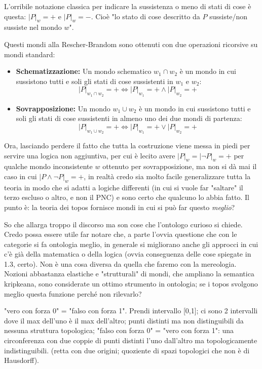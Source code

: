 \documentclass[a4paper, 11pt]{article}
\begin{document}
L'orribile notazione classica per indicare la sussistenza o meno di stati di cose è questa: $|P|_w = +$ e $|P|_w = -$. Cioè "lo stato di cose descritto da $P$ sussiste/non sussiste nel mondo $w$".

Questi mondi alla Rescher-Brandom sono ottenuti con due operazioni ricorsive su mondi standard:
\begin{itemize}
	\item \textbf{Schematizzazione:} Un mondo schematico $w_1 \cap w_2$ è un mondo in cui sussistono tutti e soli gli stati di cose sussistenti in $w_1$ e $w_2$:
	\[ |P|_{w_1 \cap w_2} = + \iff |P|_{w_1} = + \land |P|_{w_2} = + \]
	
	\item \textbf{Sovrapposizione:} Un mondo $w_1 \cup w_2$ è un mondo in cui sussistono tutti e soli gli stati di cose sussistenti in almeno uno dei due mondi di partenza:
	\[ |P|_{w_1 \cup w_2} = + \iff |P|_{w_1} = + \lor |P|_{w_2} = +\]
\end{itemize}     

Ora, lasciando perdere il fatto che tutta la costruzione viene messa in piedi per servire una logica non aggiuntiva, per cui è lecito avere $|P|_w = |\neg P|_w = +$ per qualche mondo inconsistente $w$ ottenuto per sovrapposizione, ma non si dà mai il caso in cui $|P \land \neg P|_w = +$, in realtà credo sia molto facile generalizzare tutta la teoria in modo che si adatti a logiche differenti (in cui si vuole far "saltare" il terzo escluso o altro, e non il PNC) e sono certo che qualcuno lo abbia fatto. Il punto è: la teoria dei topos fornisce mondi in cui si può far questo \emph{meglio}?

So che allarga troppo il discorso ma son cose che l'ontologo curioso si chiede. Credo possa essere utile far notare che, a parte l'ovvia questione che con le categorie si fa ontologia meglio, in generale si migliorano anche gli approcci in cui c'è già della matematica o della logica (ovvia conseguenza delle cose spiegate in 1.3, certo). Non è una cosa diversa da quella che faremo con la mereologia. Nozioni abbastanza elastiche e "strutturali" di mondi, che ampliano la semantica kripkeana, sono considerate un ottimo strumento in ontologia; se i topos svolgono meglio questa funzione perché non rilevarlo? 


"vero con forza 0" = "falso con forza 1". Prendi intervallo [0,1]; ci sono 2 intervalli dove il max dell'uno è il max dell'altro; punti distinti ma non distinguibili da nessuna struttura topologica; "falso con forza 0" = "vero con forza 1": una circonferenza con due coppie di punti distinti l'uno dall'altro ma topologicamente indistinguibili.   
(retta con due origini; quoziente di spazi topologici che non è di Hausdorff).

 
\end{document}
